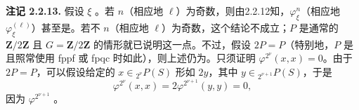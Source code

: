 \textbf{注记 2.2.13.} 假设 $\xi$ 。若 $n$（相应地 $\ell$）为奇数，则由2.2.12知，$\varphi_\xi^n$（相应地 $\varphi_\xi^{(\ell)}$）甚至是。若不 $n$（相应地 $\ell$）为奇数，这个结论不成立；$P$ 是通常的 $\mathbf Z/2\mathbf Z$ 且 $G=\mathbf Z/2\mathbf Z$ 的情形就已说明这一点。不过，假设 $2P=P$（特别地，$P$ 是且照常使用 fppf 或 fpqc 时如此），则上述仍为。只须证明 $\varphi^{2^\nu}(x,x)=0$。由于 $2P=P$，可以假设给定的 $x\in{}_{2^\nu}P(S)$ 形如 $2y$，其中 $y\in{}_{2^{\nu+1}}P(S)$，于是
\[\varphi^{2^\nu}(x,x)=2\varphi^{2^{\nu+1}}(y,y)=0,\]
因为 $\varphi^{2^{\nu+1}}$ 。

